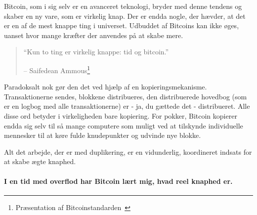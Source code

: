 \documentclass[paper=6in:9in,pagesize=pdftex,
               headinclude=on,footinclude=on,12pt]{scrbook}
\begin{document}
Bitcoin, som i sig selv er en avanceret teknologi, bryder med denne tendens og skaber en ny vare, som er virkelig knap. Der er endda nogle, der hævder, at det er en af de mest knappe ting i universet. Udbuddet af Bitcoins kan ikke øges, uanset hvor mange kræfter der anvendes på at skabe mere.\begin{quotation}\begin{samepage} \enquote{Kun to ting er virkelig knappe: tid og bitcoin.} \begin{flushright} -- Saifedean Ammous\footnote{Præsentation af Bitcoinstandarden~\cite{bitcoinstandard-pres}}
\end{flushright}\end{samepage}\end{quotation}

Paradoksalt nok gør den det ved hjælp af en kopieringsmekanisme. Transaktionerne sendes, blokkene distribueres, den distribuerede hovedbog (som er en logbog med alle transaktionerne) er - ja, du gættede det - distribueret. Alle disse ord betyder i virkeligheden bare kopiering. For pokker, Bitcoin kopierer endda sig selv til så mange computere som muligt ved at tilskynde individuelle mennesker til at køre fulde knudepunkter og udvinde nye blokke.

Alt det arbejde, der er med duplikering, er en vidunderlig, koordineret indsats for at skabe ægte knaphed.\paragraph{I en tid med overflod har Bitcoin lært mig, hvad reel knaphed er.}%
%
%
%
%
%
%
%
\end{document}
